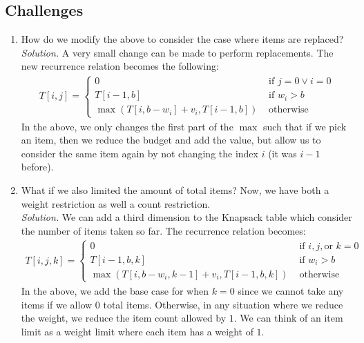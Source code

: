\documentclass[14pt]{extarticle}
\begin{document}
    \subsection*{Challenges}
    \begin{enumerate}
        \item How do we modify the above to consider the case where items are
            replaced?\\[2mm]
            \textit{Solution.} A very small change can be made to perform
            replacements. The new recurrence relation becomes the following:
            \begin{align*}
                T[i,j] = \begin{cases}
                    0       & \text{ if } j = 0\lor i = 0        \\
                    T[i-1, b] & \text{ if } w_i > b              \\
                    \max\left(
                        T[i,b-w_i] + v_i, T[i-1, b]
                    \right) & \text{ otherwise}
                \end{cases}
            \end{align*}
            In the above, we only changes the first part of the $\max$ such that
            if we pick an item, then we reduce the budget and add the value,
            but allow us to consider the same item again by not changing the
            index $i$ (it was $i-1$ before).

        \item What if we also limited the amount of total items? Now, we have
            both a weight restriction as well a count restriction.\\[2mm]
            \textit{Solution.} We can add a third dimension to the Knapsack
            table which consider the number of items taken so far. The
            recurrence relation becomes:
            \begin{align*}
                T[i,j, k] = \begin{cases}
                    0       & \text{ if } i,j, \text{or } k = 0     \\
                    T[i-1, b, k] & \text{ if } w_i > b              \\
                    \max\left(
                        T[i,b-w_i,k-1] + v_i, T[i-1, b, k]
                    \right) & \text{ otherwise}
                \end{cases}
            \end{align*}
            In the above, we add the base case for when $k = 0$ since we cannot
            take any items if we allow $0$ total items. Otherwise, in any
            situation where we reduce the weight, we reduce the item count
            allowed by $1$. We can think of an item limit as a weight limit
            where each item has a weight of $1$.

    \end{enumerate}
\end{document}
